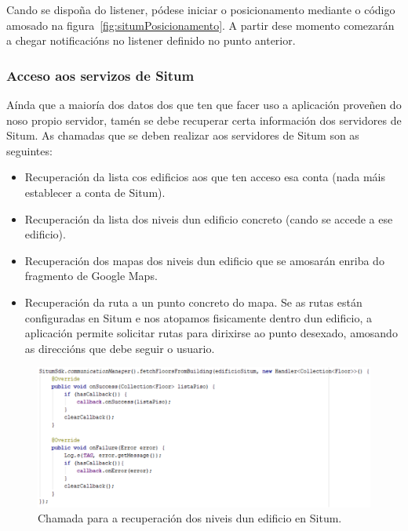 Cando se dispoña do listener, pódese iniciar o posicionamento mediante o código amosado na figura~\ref{fig:situmPosicionamento}. A partir dese momento comezarán a chegar notificacións no listener definido no punto anterior.

\subsubsection{Acceso aos servizos de Situm}
Aínda que a maioría dos datos dos que ten que facer uso a aplicación proveñen do noso propio servidor, tamén se debe recuperar certa información dos servidores de Situm. As chamadas que se deben realizar aos servidores de Situm son as seguintes:

\begin{itemize}
	\item Recuperación da lista cos edificios aos que ten acceso esa conta (nada máis establecer a conta de Situm).
	\item Recuperación da lista dos niveis dun edificio concreto (cando se accede a ese edificio).
	\item Recuperación dos mapas dos niveis dun edificio que se amosarán enriba do fragmento de Google Maps.
	\item Recuperación da ruta a un punto concreto do mapa. Se as rutas están configuradas en Situm e nos atopamos fisicamente dentro dun edificio, a aplicación permite solicitar rutas para dirixirse ao punto desexado, amosando as direccións que debe seguir o usuario.
\end{itemize}

\begin{figure}[htb] 
	\begin{center}
		\includegraphics[width=1\textwidth]{figures/codigo/situmExemploChamada}
		\caption{Chamada para a recuperación dos niveis dun edificio en Situm.}
		\label{fig:situmExemploChamada}
	\end{center}
\end{figure}

